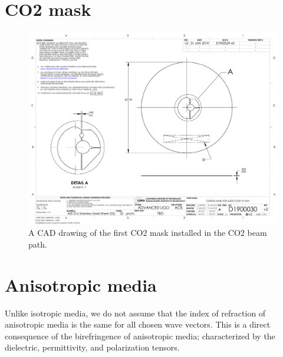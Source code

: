 \section{CO2 mask}\label{sec:CO2mask}
\begin{figure}[H]
\includegraphics[width=\textwidth]{figs/TCS/CO2mask/D1900030-v2.PDF}
\caption{A CAD drawing of the first CO2 mask installed in the CO2 beam path.}
\label{fig:co2mask1}
\end{figure}

\section{Anisotropic media}
Unlike isotropic media, we do not assume that the index of refraction of anisotropic media is the same for all chosen wave vectors. This is a direct consequence of the birefringence of anisotropic media; characterized by the dielectric, permittivity, and polarization tensors.

